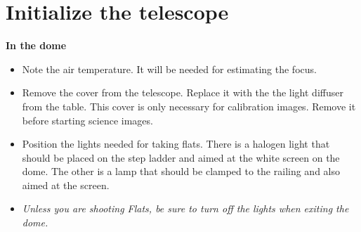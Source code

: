 \documentclass[letterpaper, 12pt]{report}
\begin{document}
\section{Initialize the telescope}


{\large\textbf{In the dome}}
\begin{itemize}
	\item Note the air temperature. It will be needed for estimating the focus.
	\item Remove the cover from the telescope. Replace it with the the light diffuser from the table. This cover is only necessary for calibration images. Remove it before starting science images.
	\item Position the lights needed for taking flats. There is a halogen light that should be placed on the step ladder and aimed at the white screen on the dome. The other is a lamp that should be clamped to the railing and also aimed at the screen.
	\item \emph{Unless you are shooting Flats, be sure to turn off the lights when exiting the dome.}
\end{itemize}
\end{document}
